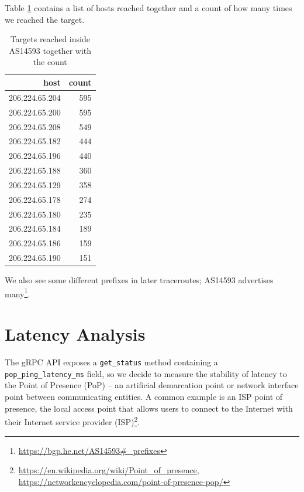\documentclass[]{report}
\begin{document}
Table \ref{tab:hops} contains a list of hosts reached together and a count of how many times we reached the target.
    
\begin{table}
    \label{tab:hops}
    \centering
    \begin{tabular}{ r r }
        \toprule
            host           & count \\ 
            \midrule
            206.224.65.204 & 595   \\
            206.224.65.200 & 595   \\
            206.224.65.208 & 549   \\ 
            206.224.65.182 & 444   \\
            206.224.65.196 & 440   \\ 
            206.224.65.188 & 360   \\ 
            206.224.65.129 & 358   \\ 
            206.224.65.178 & 274   \\ 
            206.224.65.180 & 235   \\ 
            206.224.65.184 & 189   \\ 
            206.224.65.186 & 159   \\ 
            206.224.65.190 & 151   \\
            \bottomrule
    \end{tabular}
    \caption{Targets reached inside AS14593 together with the count}
\end{table}

We also see some different prefixes in later traceroutes; AS14593 advertises
many\footnote{\url{https://bgp.he.net/AS14593\#_prefixes}}.
    
\section{Latency Analysis}

The gRPC API exposes a \texttt{get\_status} method containing a \texttt{pop\_ping\_latency\_ms} field, so we decide to
measure the stability of latency to the Point of Presence (PoP) -- an artificial demarcation point or network interface
point between communicating entities. A common example is an ISP point of presence, the local access point that allows
users to connect to the Internet with their Internet service provider
(ISP)\footnote{\url{https://en.wikipedia.org/wiki/Point_of_presence},
\url{https://networkencyclopedia.com/point-of-presence-pop/}}.
\end{document}
